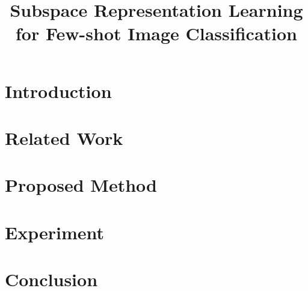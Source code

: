 \documentclass{article}
\title{Subspace Representation Learning for Few-shot Image Classification}
\begin{document}
%
\maketitle
%
\begin{abstract}

\end{abstract}
%
%

\section{Introduction}
\label{sec:intro}


\section{Related Work}
\label{sec:related_work}


\section{Proposed Method}
\label{sec:method}


\section{Experiment}
\label{sec:ep}


\section{Conclusion}
\label{sec:conclusion}





\end{document}
